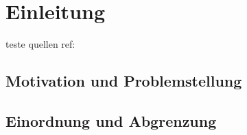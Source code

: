 \chapter{Einleitung}
\label{chap_Einleitung}

teste quellen ref: \cite{SurgSim}

\section{Motivation und Problemstellung}



%
%
%
%


\section{Einordnung und Abgrenzung}

